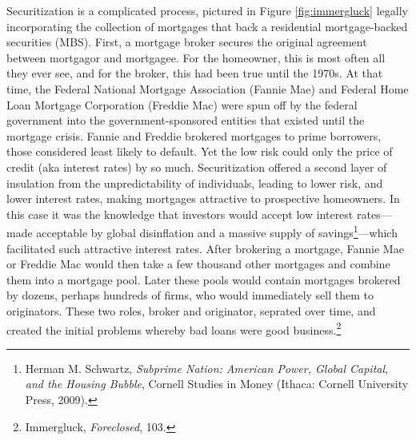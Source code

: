 \documentclass[12pt,oneside]{psthesis}
\begin{document}
Securitization is a complicated process, pictured in Figure \ref{fig:immergluck} legally incorporating the collection of mortgages that back a residential mortgage-backed securities (MBS).
First, a mortgage broker secures the original agreement between mortgagor and mortgagee.
For the homeowner, this is most often all they ever see, and for the broker, this had been true until the 1970s.
At that time, the Federal National Mortgage Association (Fannie Mae) and Federal Home Loan Mortgage Corporation (Freddie Mac) were spun off by the federal government into the government-sponsored entities that existed until the mortgage crisis.
Fannie and Freddie brokered mortgages to prime borrowers, those considered least likely to default.
Yet the low risk could only the price of credit (aka interest rates) by so much.
Securitization offered a second layer of insulation from the unpredictability of individuals, leading to lower risk, and lower interest rates, making mortgages attractive to prospective homeowners.
In this case it was the knowledge that investors would accept low interest rates---made acceptable by global disinflation and a massive supply of savings\footnote{Herman M. Schwartz, \emph{Subprime Nation: American Power, Global Capital, and the Housing Bubble}, Cornell Studies in Money (Ithaca: Cornell University Press, 2009).}---which facilitated such attractive interest rates.
After brokering a mortgage, Fannie Mae or Freddie Mac would then take a few thousand other mortgages and combine them into a mortgage pool.
Later these pools would contain mortgages brokered by dozens, perhaps hundreds of firms, who would immediately sell them to originators.
These two roles, broker and originator, seprated over time, and created the initial problems whereby bad loans were good business.\footnote{Immergluck, \emph{Foreclosed}, 103.}
\end{document}
